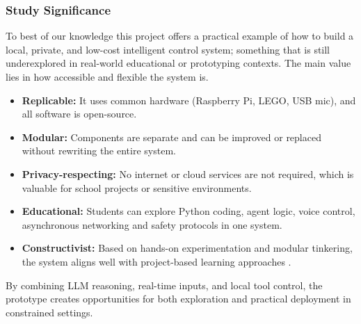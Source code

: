 \subsubsection{Study Significance}
\label{sec:background:third_subsection:study_significance}

To best of our knowledge this project offers a practical example of how to build a local, private, and low-cost intelligent control system; something that is still underexplored in real-world educational or prototyping contexts. The main value lies in how accessible and flexible the system is.

\begin{itemize}
  \item \textbf{Replicable:} It uses common hardware (Raspberry Pi, LEGO, USB mic), and all software is open-source.
  \item \textbf{Modular:} Components are separate and can be improved or replaced without rewriting the entire system.
  \item \textbf{Privacy-respecting:} No internet or cloud services are not required, which is valuable for school projects or sensitive environments.
  \item \textbf{Educational:} Students can explore Python coding, agent logic, voice control, asynchronous networking and safety protocols in one system.
  \item \textbf{Constructivist:} Based on hands-on experimentation and modular tinkering, the system aligns well with project-based learning approaches \cite{papert1980mindstorms,resnick2009kindergarten}.
\end{itemize}

By combining LLM reasoning, real-time inputs, and local tool control, the prototype creates opportunities for both exploration and practical deployment in constrained settings.

